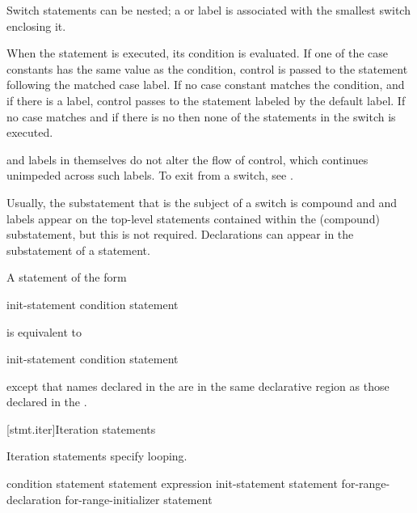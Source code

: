 \pnum
Switch statements can be nested; a  or  label
is associated with the smallest switch enclosing it.

\pnum
When the  statement is executed, its condition is
evaluated.
%
If one of the case constants has the same value as the condition,
control is passed to the statement following the matched case label. If
no case constant matches the condition, and if there is a
%
 label, control passes to the statement labeled by the
default label. If no case matches and if there is no 
then none of the statements in the switch is executed.

\pnum
{} and  labels in themselves do not alter the
flow of control, which continues unimpeded across such labels. To exit
from a switch, see .
\begin{note}
Usually, the substatement that is the subject of a switch is compound
and  and  labels appear on the top-level
statements contained within the (compound) substatement, but this is not
required.
%
Declarations can appear in the substatement of a
 statement.
\end{note}

\pnum
A  statement of the form
\begin{ncsimplebnf}
 \terminal{(} init-statement condition \terminal{)} statement
\end{ncsimplebnf}
is equivalent to
\begin{ncsimplebnf}
\terminal{\{}\br
\bnfindent init-statement\br
\bnfindent {} \terminal{(} condition \terminal{)} statement\br
\terminal{\}}
\end{ncsimplebnf}
except that names declared in the  are in
the same declarative region as those declared in the
.%

[stmt.iter]{Iteration statements}%

\pnum
Iteration statements specify looping.

%
%
%
%
\begin{bnf}
\br
     \terminal{(} condition \terminal{)} statement\br
     statement  \terminal{(} expression \terminal{)} \terminal{;}\br
     \terminal{(} init-statement  \terminal{;}  \terminal{)} statement\br
     \terminal{(}  for-range-declaration \terminal{:} for-range-initializer \terminal{)} statement
\end{bnf}

